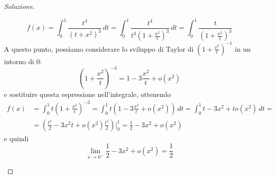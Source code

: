 \begin{proof}[Soluzione]
\begin{enumerate}[(i)]
        \[
        f(x) = \int_0^1 \frac{t^4}{(t+x^2)^3}\, dt = \int_0^1 \frac{t^4}{t^3\left(1+\frac{x^2}{t}\right)^3}\, dt = \int_0^1 \frac{t}{\left(1+\frac{x^2}{t}\right)^3}
        \]
        A questo punto, possiamo considerare lo sviluppo di Taylor di $\left(1+\frac{x^2}{t}\right)^{-1}$ in un intorno di 0:
        \[
        \left(1+\frac{x^2}{t}\right)^{-3} = 1 -3\frac{x^2}{t} + o(x^2)
        \]
        e sostituire questa espressione nell'integrale, ottenendo
        \[
        \begin{split}
            f(x) & = \int_0^1 t\left(1+\frac{x^2}{t}\right)^{-3} = \int_0^1 t\left(1-3\frac{x^2}{t}+o(x^2)\right)\, dt = \int_0^1 t - 3x^2 + to(x^2)\, dt = \\
            & = \left(\frac{t^2}{2}-3x^2t+o(x^2)\frac{t^2}{2}\right)\bigg|_0^1 = \frac{1}{2}-3x^2 +o(x^2)
        \end{split}
        \]
        e quindi
        \[
        \lim_{x\to 0^+} \frac{1}{2}-3x^2 +o(x^2) = \frac{1}{2}
        \]
    \end{enumerate} 
\end{proof}
\newpage